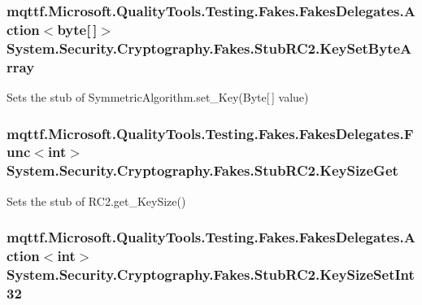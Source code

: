 \hypertarget{class_system_1_1_security_1_1_cryptography_1_1_fakes_1_1_stub_r_c2_a56a396ad7e614209c48f87680231a93b}{
\subsubsection[{Key\-Set\-Byte\-Array}]{\setlength{\rightskip}{0pt plus 5cm}mqttf.\-Microsoft.\-Quality\-Tools.\-Testing.\-Fakes.\-Fakes\-Delegates.\-Action$<$byte\mbox{[}$\,$\mbox{]}$>$ System.\-Security.\-Cryptography.\-Fakes.\-Stub\-R\-C2.\-Key\-Set\-Byte\-Array}}\label{class_system_1_1_security_1_1_cryptography_1_1_fakes_1_1_stub_r_c2_a56a396ad7e614209c48f87680231a93b}


Sets the stub of Symmetric\-Algorithm.\-set\-\_\-\-Key(\-Byte\mbox{[}$\,$\mbox{]} value)

\hypertarget{class_system_1_1_security_1_1_cryptography_1_1_fakes_1_1_stub_r_c2_aecd0d81979ddb8c4f9953066941632e8}{
\subsubsection[{Key\-Size\-Get}]{\setlength{\rightskip}{0pt plus 5cm}mqttf.\-Microsoft.\-Quality\-Tools.\-Testing.\-Fakes.\-Fakes\-Delegates.\-Func$<$int$>$ System.\-Security.\-Cryptography.\-Fakes.\-Stub\-R\-C2.\-Key\-Size\-Get}}\label{class_system_1_1_security_1_1_cryptography_1_1_fakes_1_1_stub_r_c2_aecd0d81979ddb8c4f9953066941632e8}


Sets the stub of R\-C2.\-get\-\_\-\-Key\-Size()

\hypertarget{class_system_1_1_security_1_1_cryptography_1_1_fakes_1_1_stub_r_c2_a67040539777a840710f902fd028ae3db}{
\subsubsection[{Key\-Size\-Set\-Int32}]{\setlength{\rightskip}{0pt plus 5cm}mqttf.\-Microsoft.\-Quality\-Tools.\-Testing.\-Fakes.\-Fakes\-Delegates.\-Action$<$int$>$ System.\-Security.\-Cryptography.\-Fakes.\-Stub\-R\-C2.\-Key\-Size\-Set\-Int32}}\label{class_system_1_1_security_1_1_cryptography_1_1_fakes_1_1_stub_r_c2_a67040539777a840710f902fd028ae3db}


